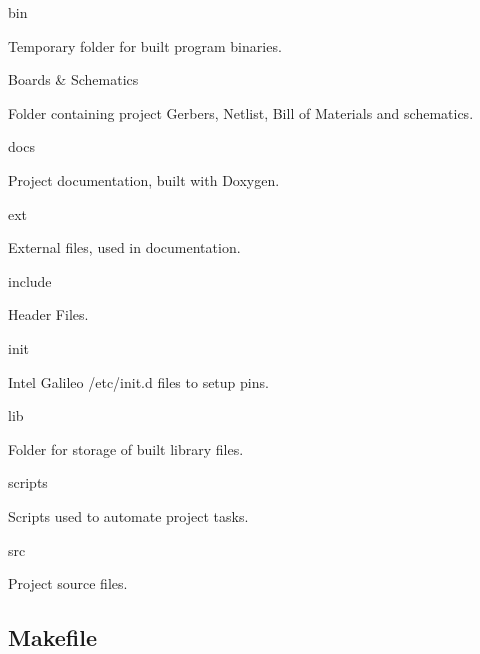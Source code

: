 \begin{DoxyItemize}
\item bin
\begin{DoxyItemize}
\item Temporary folder for built program binaries.
\end{DoxyItemize}
\item Boards \& Schematics
\begin{DoxyItemize}
\item Folder containing project Gerbers, Netlist, Bill of Materials and schematics.
\end{DoxyItemize}
\item docs
\begin{DoxyItemize}
\item Project documentation, built with Doxygen.
\end{DoxyItemize}
\item ext
\begin{DoxyItemize}
\item External files, used in documentation.
\end{DoxyItemize}
\item include
\begin{DoxyItemize}
\item Header Files.
\end{DoxyItemize}
\item init
\begin{DoxyItemize}
\item Intel Galileo {\ttfamily /etc/init.d} files to setup pins.
\end{DoxyItemize}
\item lib
\begin{DoxyItemize}
\item Folder for storage of built library files.
\end{DoxyItemize}
\item scripts
\begin{DoxyItemize}
\item Scripts used to automate project tasks.
\end{DoxyItemize}
\item src
\begin{DoxyItemize}
\item Project source files.
\end{DoxyItemize}
\end{DoxyItemize}

\subsection*{Makefile}

